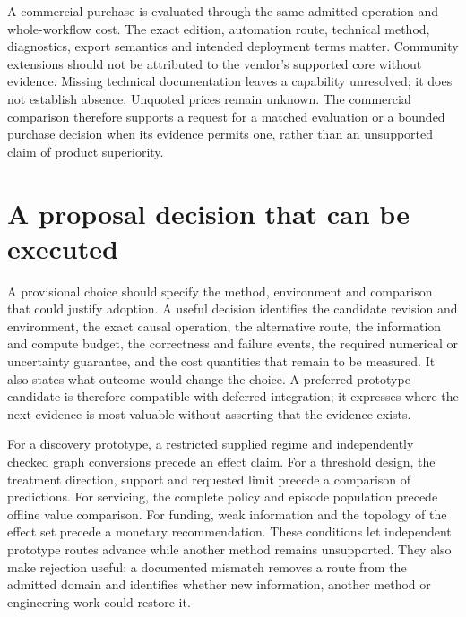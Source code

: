A commercial purchase is evaluated through the same admitted operation and
whole-workflow cost. The exact edition, automation route, technical method,
diagnostics, export semantics and intended deployment terms matter. Community
extensions should not be attributed to the vendor's supported core without
evidence. Missing technical documentation leaves a capability unresolved; it
does not establish absence. Unquoted prices remain unknown. The commercial
comparison therefore supports a request for a matched evaluation or a bounded
purchase decision when its evidence permits one, rather than an unsupported
claim of product superiority.
\citep{exec16_s10_design}

\section{A proposal decision that can be executed}

A provisional choice should specify the method, environment and comparison that could justify adoption. A useful
decision identifies the candidate revision and environment, the exact causal
operation, the alternative route, the information and compute budget, the
correctness and failure events, the required numerical or uncertainty
guarantee, and the cost quantities that remain to be measured. It also states
what outcome would change the choice. A preferred prototype candidate is
therefore compatible with deferred integration; it expresses where the next
evidence is most valuable without asserting that the evidence exists.
\citep{exec16_s10_design}

For a discovery prototype, a restricted supplied regime and independently
checked graph conversions precede an effect claim. For a threshold design,
the treatment direction, support and requested limit precede a comparison of
predictions. For servicing, the complete policy and episode population precede
offline value comparison. For funding, weak information and the topology of
the effect set precede a monetary recommendation. These conditions let
independent prototype routes advance while another method remains unsupported.
They also make rejection useful: a documented mismatch removes a route from
the admitted domain and identifies whether new information, another method or
engineering work could restore it.

